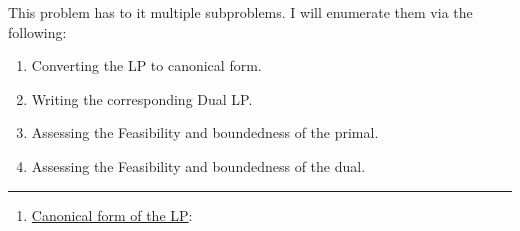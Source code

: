 \begin{solution}

    This problem has to it multiple subproblems. I will enumerate them via the following:
    \begin{enumerate}
        \item Converting the LP to canonical form.
        \item Writing the corresponding Dual LP.
        \item Assessing the Feasibility and boundedness of the primal.
        \item Assessing the Feasibility and boundedness of the dual.
    \end{enumerate}
    \vspace{-6mm}\hspace{4mm} \rule{15cm}{1pt}
    \begin{enumerate}
        \item \underline{Canonical form of the LP}:


\end{enumerate}
\end{solution}
